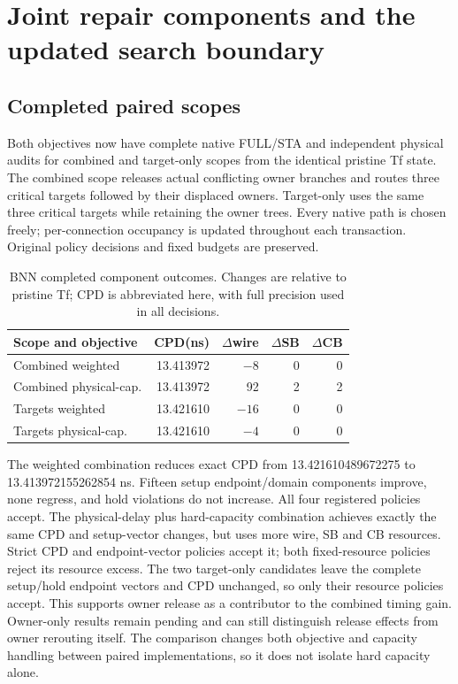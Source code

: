 
\section{Joint repair components and the updated search boundary}
\subsection{Completed paired scopes}
Both objectives now have complete native FULL/STA and independent physical audits for combined and target-only scopes from the identical pristine Tf state. The combined scope releases actual conflicting owner branches and routes three critical targets followed by their displaced owners. Target-only uses the same three critical targets while retaining the owner trees. Every native path is chosen freely; per-connection occupancy is updated throughout each transaction. Original policy decisions and fixed budgets are preserved.

\begin{table}[t]
\centering\small
\caption{BNN completed component outcomes. Changes are relative to pristine Tf; CPD is abbreviated here, with full precision used in all decisions.}
\begin{tabular}{lrrrr}
\hline
Scope and objective & CPD(ns) & $\Delta$wire & $\Delta$SB & $\Delta$CB\\
\hline
Combined weighted & 13.413972 & $-8$ & 0 & 0\\
Combined physical-cap. & 13.413972 & 92 & 2 & 2\\
Targets weighted & 13.421610 & $-16$ & 0 & 0\\
Targets physical-cap. & 13.421610 & $-4$ & 0 & 0\\
\hline
\end{tabular}
\end{table}

The weighted combination reduces exact CPD from 13.421610489672275 to 13.413972155262854 ns. Fifteen setup endpoint/domain components improve, none regress, and hold violations do not increase. All four registered policies accept. The physical-delay plus hard-capacity combination achieves exactly the same CPD and setup-vector changes, but uses more wire, SB and CB resources. Strict CPD and endpoint-vector policies accept it; both fixed-resource policies reject its resource excess. The two target-only candidates leave the complete setup/hold endpoint vectors and CPD unchanged, so only their resource policies accept. This supports owner release as a contributor to the combined timing gain. Owner-only results remain pending and can still distinguish release effects from owner rerouting itself. The comparison changes both objective and capacity handling between paired implementations, so it does not isolate hard capacity alone.

